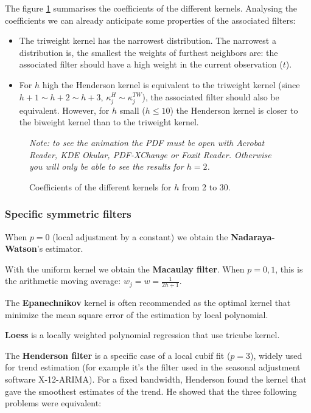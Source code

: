 \documentclass[
  12pt,
  ,
  a4paper]{article}
\newcommand\1{\mathds{1}}
\begin{document}
The figure \ref{fig:kernels} summarises the coefficients of the different kernels.
Analysing the coefficients we can already anticipate some properties of the associated filters:

\begin{itemize}
\item
  The triweight kernel has the narrowest distribution.
  The narrowest a distribution is, the smallest the weights of furthest neighbors are: the associated filter should have a high weight in the current observation (\(t\)).
\item
  For \(h\) high the Henderson kernel is equivalent to the triweight kernel (since \(h+1\sim h+2 \sim h+3\), \(\kappa_j^H\sim\kappa_j^{TW}\)), the associated filter should also be equivalent.
  However, for \(h\) small (\(h\leq10\)) the Henderson kernel is closer to the biweight kernel than to the triweight kernel.
\end{itemize}

\begin{figure}[!ht]
\caption{Coefficients of the different kernels for $h$ from 2 to 30.}\label{fig:kernels}\footnotesize
\emph{Note: to see the animation the PDF must be open with Acrobat Reader, KDE Okular, PDF-XChange or Foxit Reader. 
Otherwise you will only be able to see the results for $h=2$.}
\end{figure}

\hypertarget{sec:sympolyfilter}{%
\subsubsection{Specific symmetric filters}\label{sec:sympolyfilter}}

When \(p=0\) (local adjustment by a constant) we obtain the \textbf{Nadaraya-Watson}'s estimator.

With the uniform kernel we obtain the \textbf{Macaulay filter}. When \(p=0,1\), this is the arithmetic moving average: \(w_j=w=\frac{1}{2h+1}\).

The \textbf{Epanechnikov} kernel is often recommended as the optimal kernel that minimize the mean square error of the estimation by local polynomial.

\textbf{Loess} is a locally weighted polynomial regression that use tricube kernel.

The \textbf{Henderson filter} is a specific case of a local cubif fit (\(p=3\)), widely used for trend estimation (for example it's the filter used in the seasonal adjustment software X-12-ARIMA). For a fixed bandwidth, Henderson found the kernel that gave the smoothest estimates of the trend.
He showed that the three following problems were equivalent:
\end{document}
